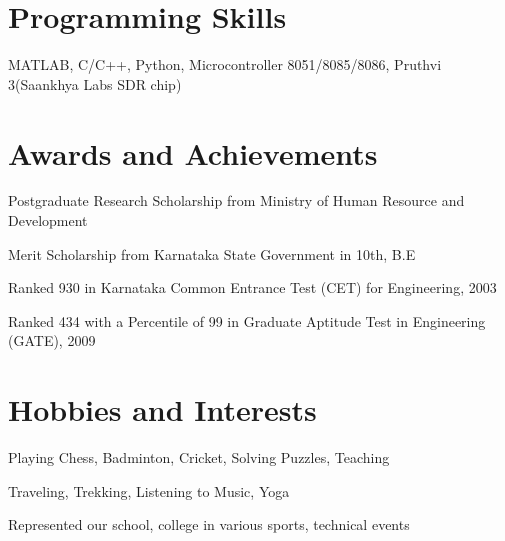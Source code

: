 \documentclass[line]{resume}
\begin{document}
{\begin{resume}
\begin{list2}
         
        \end{list2}

       

       \section{\mysidestyle Programming Skills} \vspace{1mm}
            
           MATLAB, C/C++, Python, Microcontroller 8051/8085/8086, Pruthvi 3(Saankhya Labs SDR chip)


    \section{\mysidestyle Awards and Achievements} 
    \begin{list2}
    \item Postgraduate Research Scholarship from Ministry of Human Resource and Development
    \item Merit Scholarship from Karnataka State Government in 10th, B.E                             
    \item Ranked 930 in Karnataka Common Entrance Test (CET) for Engineering, 2003    
    \item Ranked 434 with a Percentile of 99 in Graduate Aptitude Test in Engineering (GATE), 2009 
    
    \end{list2} 
 
    \section{\mysidestyle Hobbies and Interests} 
    \begin{list2}
     \item Playing Chess, Badminton, Cricket, Solving Puzzles, Teaching 
     \item Traveling, Trekking, Listening to Music, Yoga 
     \item Represented our school, college in various sports, technical events    
    \end{list2}


\end{resume}}
\end{document}
